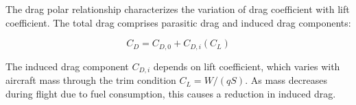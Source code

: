 The drag polar relationship characterizes the variation of drag coefficient with lift coefficient. The total drag comprises parasitic drag and induced drag components:

\begin{equation}
C_D = C_{D,0} + C_{D,i}(C_L)
\end{equation}

The induced drag component $C_{D,i}$ depends on lift coefficient, which varies with aircraft mass through the trim condition $C_L = W/(qS)$. As mass decreases during flight due to fuel consumption, this causes a reduction in induced drag.

 
